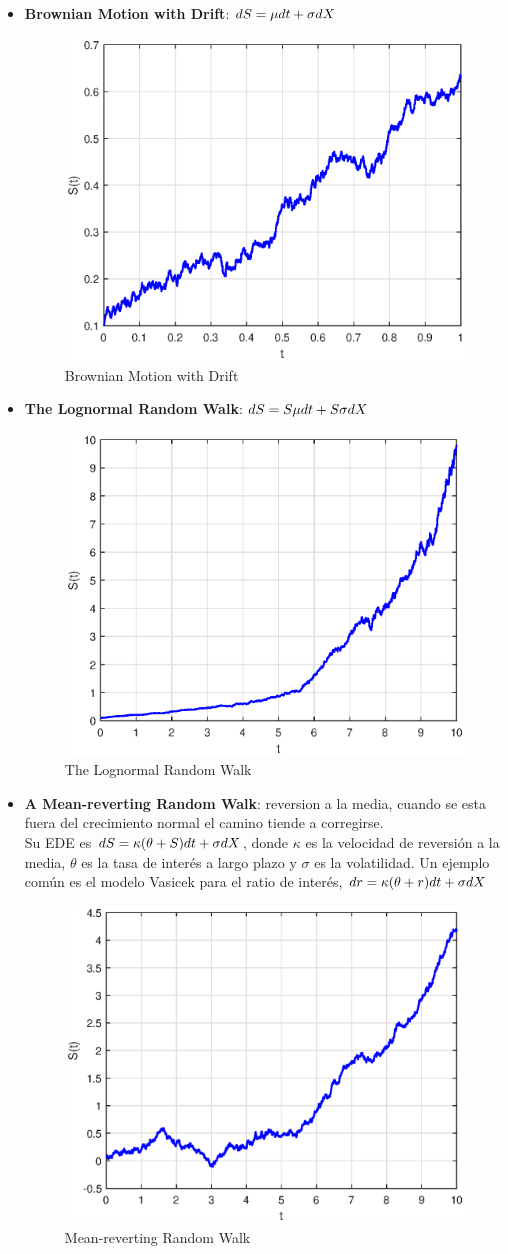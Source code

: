 \begin{itemize}
    \item \textbf{Brownian Motion with Drift}: $dS = \mu dt + \sigma d\mathnormal{X}$
    \begin{figure}[H]
        \centering
        \includegraphics[width=0.5\linewidth]{Imagenes/3_Aleatoriedad/BrownianMotionDrift.eps}
        \caption{Brownian Motion with Drift}
    \end{figure}
    \item \textbf{The Lognormal Random Walk}: $dS = S\mu dt + S\sigma d\mathnormal{X}$
    \begin{figure}[H]
        \centering
        \includegraphics[width=0.5\linewidth]{Imagenes/3_Aleatoriedad/LognormalRandomWalk.eps}
        \caption{The Lognormal Random Walk}
    \end{figure}
    \item \textbf{A Mean-reverting Random Walk}: reversion a la media, cuando se esta fuera del crecimiento normal el camino tiende a corregirse.\\
    Su EDE es $dS = \kappa(\theta+S) dt + \sigma d\mathnormal{X}$, donde $\kappa$ es la velocidad de reversión a la media, $\theta$ es la tasa de interés a largo plazo y $\sigma$ es la volatilidad. Un ejemplo común es el modelo Vasicek para el ratio de interés, $dr = \kappa(\theta+r) dt + \sigma d\mathnormal{X}$
    \begin{figure}[H]
        \centering
        \includegraphics[width=0.5\linewidth]{Imagenes/3_Aleatoriedad/MeanRevertingWalk.eps}
        \caption{Mean-reverting Random Walk}
    \end{figure}
\end{itemize}











